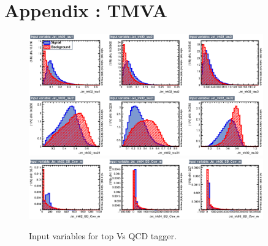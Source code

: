 \section{ Appendix : TMVA}
\label{appendix:tmva}

\begin{figure}[!htb]\centering
\includegraphics[width=0.9\textwidth]{Fig/TMVA/thad_vs_QCD/variables_id_c1.eps}
\includegraphics[width=0.9\textwidth,trim={0 5cm 0 0},clip]{Fig/TMVA/thad_vs_QCD/variables_id_c2.eps}
\caption{Input variables for top Vs QCD tagger.}
\label{fig:TMVA_inputs_t}
\end{figure}

